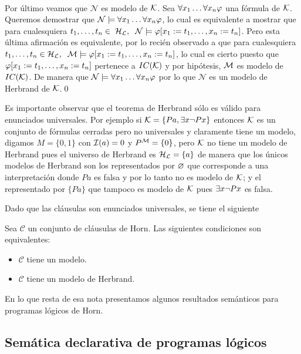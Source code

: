 \documentclass[11pt,letterpaper]{article}
\begin{document}
\\ Por \'ultimo veamos que $\mathcal{N}$ es modelo de $\mathcal{K}$. Sea $\forall 
x_1\ldots\forall
x_n\varphi$ una f\'ormula de $\mathcal{K}$. Queremos demostrar que $\mathcal{N}\models\forall
x_1\ldots\forall x_n\varphi$, lo cual es equivalente a mostrar que para cualesquiera 
$t_1,\ldots,t_n\in\;\mathcal{H}_{\mathcal{L}},\;\;\mathcal{N}\models\varphi[x_1:=t_1,\ldots,x_n:=t_n]$. 
Pero esta \'ultima afirmaci\'on es equivalente, por lo reci\'en observado a que
para cualesquiera
$t_1,\ldots,t_n\in \mathcal{H}_{\mathcal{L}},\;\;\mathcal{M}\models\varphi[x_1:=t_1,\ldots,x_n:=t_n]$,
lo cual es cierto puesto que $\varphi[x_1:=t_1,\ldots,x_n:=t_n]$ pertenece a
$IC(\mathcal{K})$ y por hip\'otesis, $\mathcal{M}$ es modelo de $IC(\mathcal{K})$. De manera que 
$\mathcal{N}\models\forall x_1\ldots\forall x_n\varphi$ por lo que $\mathcal{N}$ es un 
modelo de Herbrand de $\mathcal{K}$.\qed 


\medskip

Es importante observar que el teorema de Herbrand s\'olo es v\'alido para
enunciados universales. Por ejemplo si 
$\mathcal{K}=\{Pa,\exists x \neg Px\}$ entonces $\mathcal{K}$ es un conjunto de f\'ormulas cerradas
pero no universales y claramente tiene un modelo, digamos
$M=\{0,1\}$ con $\mathcal{I}(a)=0$ y $P^{\mathcal{M}}=\{0\}$, pero $\mathcal{K}$ no tiene un modelo de 
Herbrand pues el universo de Herbrand es $\mathcal{H}_{\mathcal{L}}=\{a\}$ de manera que los 
\'unicos modelos de Herbrand son los representados por $\varnothing$ que corresponde 
a una  interpretaci\'on donde $Pa$ es falsa y por lo tanto no es modelo de 
$\mathcal{K}$; y el representado por $\{Pa\}$ que tampoco es modelo de $\mathcal{K}$ pues $\exists 
x\neg Px$ es falsa.

\smallskip

Dado que las cl\'ausulas son enunciados universales, se tiene el siguiente
\vspace*{-5pt}
\begin{corollary}
Sea $\mathcal{C}$ un conjunto de cl\'ausulas de Horn. Las siguientes 
condiciones son equivalentes:
  \begin{itemize}
  \item $\mathcal{C}$ tiene un modelo.
  \item $\mathcal{C}$ tiene un modelo de Herbrand.
  \end{itemize}
\end{corollary}

\noindent En lo que resta de esa nota presentamos algunos resultados 
sem\'anticos para programas l\'ogicos de Horn. 


\subsection{Sem\'atica declarativa de programas l\'ogicos}
\end{document}
